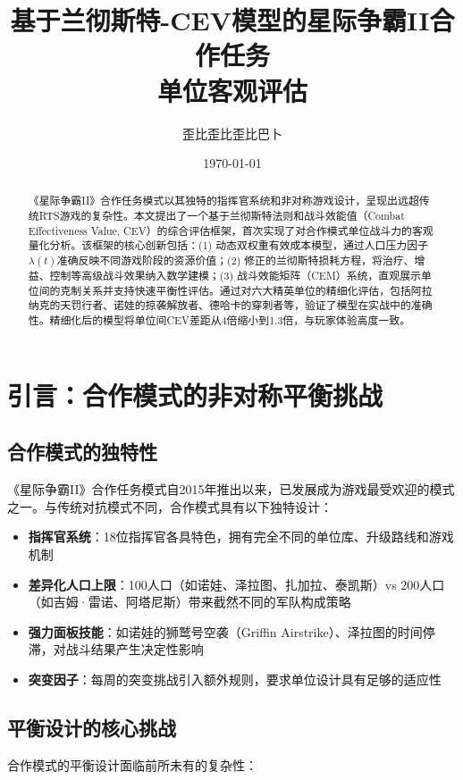 \documentclass[a4paper,12pt]{article}
\title{\textbf{基于兰彻斯特-CEV模型的星际争霸II合作任务\\单位客观评估}}
\author{歪比歪比歪比巴卜}
\date{\today}
\begin{document}
\maketitle

\begin{abstract}
\noindent
《星际争霸II》合作任务模式以其独特的指挥官系统和非对称游戏设计，呈现出远超传统RTS游戏的复杂性。本文提出了一个基于兰彻斯特法则和战斗效能值（Combat Effectiveness Value, CEV）的综合评估框架，首次实现了对合作模式单位战斗力的客观量化分析。该框架的核心创新包括：(1) 动态双权重有效成本模型，通过人口压力因子$\lambda(t)$准确反映不同游戏阶段的资源价值；(2) 修正的兰彻斯特损耗方程，将治疗、增益、控制等高级战斗效果纳入数学建模；(3) 战斗效能矩阵（CEM）系统，直观展示单位间的克制关系并支持快速平衡性评估。通过对六大精英单位的精细化评估，包括阿拉纳克的天罚行者、诺娃的掠袭解放者、德哈卡的穿刺者等，验证了模型在实战中的准确性。精细化后的模型将单位间CEV差距从4倍缩小到1.3倍，与玩家体验高度一致。
\end{abstract}

\tableofcontents
\newpage

\section{引言：合作模式的非对称平衡挑战}

\subsection{合作模式的独特性}
《星际争霸II》合作任务模式自2015年推出以来，已发展成为游戏最受欢迎的模式之一。与传统对抗模式不同，合作模式具有以下独特设计：

\begin{itemize}
\item \textbf{指挥官系统}：18位指挥官各具特色，拥有完全不同的单位库、升级路线和游戏机制
\item \textbf{差异化人口上限}：100人口（如诺娃、泽拉图、扎加拉、泰凯斯）vs 200人口（如吉姆·雷诺、阿塔尼斯）带来截然不同的军队构成策略
\item \textbf{强力面板技能}：如诺娃的狮鹫号空袭（Griffin Airstrike）、泽拉图的时间停滞，对战斗结果产生决定性影响
\item \textbf{突变因子}：每周的突变挑战引入额外规则，要求单位设计具有足够的适应性
\end{itemize}

\subsection{平衡设计的核心挑战}
合作模式的平衡设计面临前所未有的复杂性：
\end{document}
